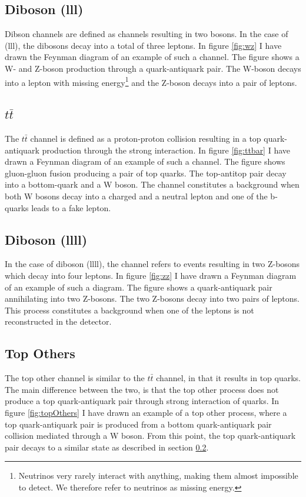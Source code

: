 \subsection{Diboson (lll)}
Dibson channels are defined as channels resulting in two bosons. In the case of (lll), the dibosons
decay into a total of three leptons. In figure \ref{fig:wz} I have drawn the Feynman diagram of an 
example of such a channel. The figure shows a W- and Z-boson production through a quark-antiquark pair.
The W-boson decays into a lepton with missing energy\footnote{Neutrinos very rarely interact
with anything, making them almost impossible to detect. We therefore refer to neutrinos as missing energy.}
and the Z-boson decays into a pair of leptons. 

\subsection{$t\bar{t}$}\label{subsec:ttbar}
The $t\bar{t}$ channel is defined as a proton-proton collision resulting in a top quark-antiquark production 
through the strong interaction. In figure \ref{fig:ttbar} I have drawn a Feynman diagram of an example of such 
a channel. The figure shows gluon-gluon fusion producing a pair of top quarks. The top-antitop pair decay into 
a bottom-quark and a W boson. The channel constitutes a background when both W bosons decay into a charged and a 
neutral lepton and one of the b-quarks leads to a fake lepton.

\subsection{Diboson (llll)}
In the case of diboson (llll), the channel refers to events resulting in two Z-bosons which decay 
into four leptons. In figure \ref{fig:zz} I have drawn a Feynman diagram of an example of 
such a diagram. The figure shows a quark-antiquark pair annihilating into two Z-bosons.
The two Z-bosons decay into two pairs of leptons. This process constitutes a background when one 
of the leptons is not reconstructed in the detector.


\subsection{Top Others}
The top other channel is similar to the $t\bar{t}$ channel, in that it results in top quarks. The main difference between 
the two, is that the top other process does not produce a top quark-antiquark pair through strong interaction of quarks. 
In figure \ref{fig:topOthers} I have drawn an example of a top other process, where a top quark-antiquark pair is produced 
from a bottom quark-antiquark pair collision mediated through a W boson. From this point, the top quark-antiquark pair decays 
to a similar state as described in section \ref{subsec:ttbar}. 

